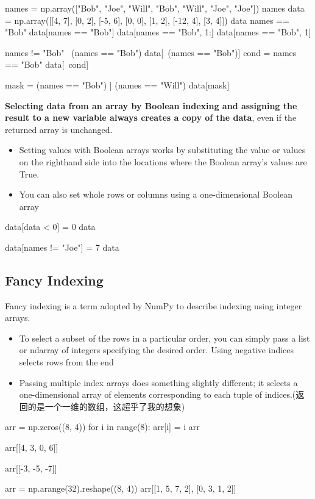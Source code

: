 \begin{pyc}
names = np.array(["Bob", "Joe", "Will", "Bob", "Will", "Joe", "Joe"])
names
data = np.array([[4, 7], [0, 2], [-5, 6], [0, 0], [1, 2], [-12, 4], [3, 4]])
data
names == "Bob"
data[names == "Bob"]
data[names == "Bob", 1:]
data[names == "Bob", 1]

names != "Bob"
~(names == "Bob")
data[~(names == "Bob")]
cond = names == "Bob"
data[~cond]

mask = (names == "Bob") | (names == "Will")
data[mask]  
\end{pyc}

\textbf{Selecting data from an array by Boolean indexing and assigning the result to a new variable always creates a copy of the data}, even if the returned array is unchanged.


\begin{itemize}
    \item Setting values with Boolean arrays works by substituting the value or values on the righthand side into the locations where the Boolean array's values are True.
    \item You can also set whole rows or columns using a one-dimensional Boolean array
\end{itemize}

\begin{pyc}
data[data < 0] = 0
data

data[names != "Joe"] = 7
data
\end{pyc}
\subsection{Fancy Indexing}
Fancy indexing is a term adopted by NumPy to describe indexing using integer arrays.
\begin{itemize}
    \item To select a subset of the rows in a particular order, you can simply pass a list or
    ndarray of integers specifying the desired order. Using negative indices selects rows from
    the end
    \item Passing multiple index arrays does something slightly different; it selects a one-dimensional array of elements corresponding to each tuple of indices.(返回的是一个一维的数组，这超乎了我的想象)
\end{itemize}

\begin{pyc}
arr = np.zeros((8, 4))
for i in range(8):
    arr[i] = i
arr

arr[[4, 3, 0, 6]]

arr[[-3, -5, -7]]

arr = np.arange(32).reshape((8, 4))
arr[[1, 5, 7, 2], [0, 3, 1, 2]]
\end{pyc}

